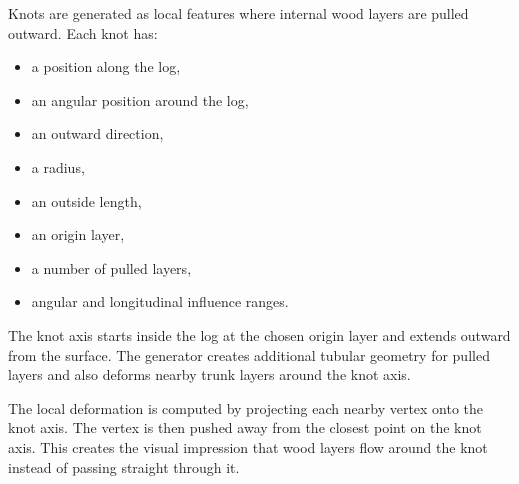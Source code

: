 \documentclass{egpubl}
\begin{document}
Knots are generated as local features where internal wood layers are pulled outward. Each knot has:

\begin{itemize}
    \item a position along the log,
    \item an angular position around the log,
    \item an outward direction,
    \item a radius,
    \item an outside length,
    \item an origin layer,
    \item a number of pulled layers,
    \item angular and longitudinal influence ranges.
\end{itemize}

The knot axis starts inside the log at the chosen origin layer and extends outward from the surface. The generator creates additional tubular geometry for pulled layers and also deforms nearby trunk layers around the knot axis.

The local deformation is computed by projecting each nearby vertex onto the knot axis. The vertex is then pushed away from the closest point on the knot axis. This creates the visual impression that wood layers flow around the knot instead of passing straight through it.
\end{document}
